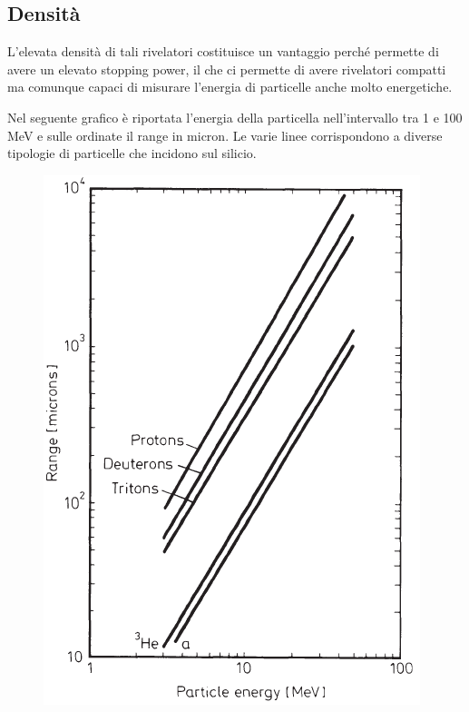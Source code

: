 \subsection{Densità}
L'elevata densità di tali rivelatori costituisce un vantaggio perché permette di avere un elevato stopping power, il che ci permette di avere rivelatori compatti ma comunque capaci di misurare l'energia di particelle anche molto energetiche.

\begin{esempio}
   Nel seguente grafico è riportata l'energia della particella nell'intervallo tra 1 e 100 MeV e sulle ordinate il range in micron. Le varie linee corrispondono a diverse tipologie di particelle che incidono sul silicio.

   \begin{minipage}{0.39\textwidth}
      \begin{figure}[H]
         \centering
         \includegraphics[width=\textwidth]{immagini/range_particelle_in_semiconduttori.png}

\end{figure}
\end{minipage}
\end{esempio}
